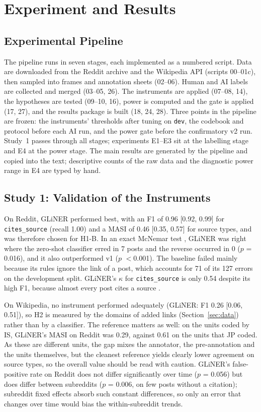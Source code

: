 \documentclass[10pt,a4paper]{article}
\newcommand{\kod}[1]{\texttt{#1}}
\begin{document}
\section{Experiment and Results}
\label{sec:results}

\subsection{Experimental Pipeline}
The pipeline runs in seven stages, each implemented as a numbered script.
Data are downloaded from the Reddit archive and the Wikipedia API (scripts
00--01c), then sampled into frames and annotation sheets (02--06). Human and AI labels are collected and
merged (03--05, 26). The instruments are applied (07--08, 14), the hypotheses are tested (09--10, 16),
power is computed and the gate is applied (17, 27), and the results package is built (18, 24, 28). Three
points in the pipeline are frozen: the instruments' thresholds after tuning on \kod{dev}, the codebook and
protocol before each AI run, and the power gate before the confirmatory v2 run. Study~1 passes through all stages; experiments E1--E3 sit at
the labelling stage and E4 at the power stage. The main results are generated by the pipeline and copied into the text;
descriptive counts of the raw data and the diagnostic power range in E4 are typed by hand.

\subsection{Study 1: Validation of the Instruments}
\label{sec:validation}

On Reddit, GLiNER performed best, with an F1 of 0.96 [0.92, 0.99] for
\kod{cites\_source} (recall 1.00) and a MASI of
0.46 [0.35, 0.57] for source types, and was therefore chosen for H1-B.
In an exact McNemar test \cite{mcnemar1947}, GLiNER was right where the zero-shot
classifier erred in 7 posts and the reverse
occurred in 0 ($p$ = 0.016),
and it also outperformed v1 ($p$ $<$0.001).
The baseline failed mainly because its rules ignore the link of a post, which accounts
for 71 of its 127 errors on the development split.
GLiNER's $\kappa$ for \kod{cites\_source} is only 0.54 despite
its high F1, because almost every post cites a source \cite{feinstein1990}.

On Wikipedia, no instrument performed adequately (GLiNER: F1 0.26 [0.06, 0.51]),
so H2 is measured by the domains of added links (Section~\ref{sec:data}) rather than by a classifier.
The reference matters as well: on the units coded by IS, GLiNER's
MASI on Reddit was 0.29, against 0.61 on the
units that JP coded. As these are different units, the gap
mixes the annotator, the pre-annotation and the units themselves, but the cleanest
reference yields clearly lower agreement on source types, so the overall value should be
read with caution.
GLiNER's false-positive rate on Reddit does not differ significantly over time
($p$ = 0.056) but does differ between subreddits
($p$ = 0.006, on few posts without a citation); subreddit
fixed effects absorb such constant differences, so only an error that changes over time
would bias the within-subreddit trends.
\end{document}

